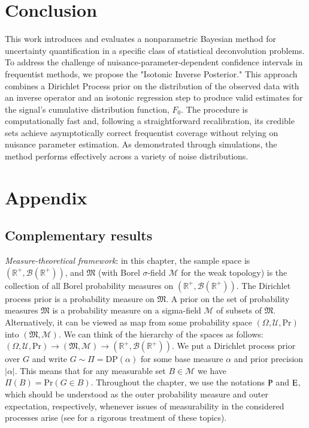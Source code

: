 \section{Conclusion}

This work introduces and evaluates a nonparametric Bayesian method for uncertainty quantification in a specific class of statistical deconvolution problems. To address the challenge of nuisance-parameter-dependent confidence intervals in frequentist methods, we propose the "Isotonic Inverse Posterior." This approach combines a Dirichlet Process prior on the distribution of the observed data with an inverse operator and an isotonic regression step to produce valid estimates for the signal's cumulative distribution function, \(F_0\). The procedure is computationally fast and, following a straightforward recalibration, its credible sets achieve asymptotically correct frequentist coverage without relying on nuisance parameter estimation. As demonstrated through simulations, the method performs effectively across a variety of noise distributions.


\newpage

\section{Appendix}\label{sec: appendix chapter4}

\subsection{Complementary results}
\textit{Measure-theoretical framework}: in this chapter, the sample space is $(\mathbb{R}^+, \mathscr{B}(\mathbb{R}^+))$, and $\mathfrak{M}$ (with Borel $\sigma$-field $\mathscr{M}$ for the weak topology) is the collection of all Borel probability measures on $(\mathbb{R}^+, \mathscr{B}(\mathbb{R}^+))$. The Dirichlet process prior is a probability measure on $\mathfrak{M}$. A prior on the set of probability measures $\mathfrak{M}$ is a probability measure on a sigma-field $\mathscr{M}$ of subsets of $\mathfrak{M}$. Alternatively, it can be viewed as map from some probability space $(\Omega, \mathscr{U}, \mathrm{Pr})$ into $(\mathfrak{M}, \mathscr{M})$. We can think of the hierarchy of the spaces as follows: $(\Omega, \mathscr{U}, \mathrm{Pr}) \rightarrow (\mathfrak{M}, \mathscr{M}) \rightarrow (\mathbb{R}^+, \mathscr{B}(\mathbb{R}^+))$. We put a Dirichlet process prior over $G$ and write $G \sim \Pi = \mathrm{DP}( \alpha)$ for some base measure $\alpha$ and prior precision $|\alpha|$. This means that for any measurable set $B \in \mathscr{M}$ we have $\Pi(B) = \mathrm{Pr} ( G \in B)$. Throughout the chapter, we use the notations $\mathrm{P}$ and $\mathrm{E}$, which should be understood as the outer probability measure and outer expectation, respectively, whenever issues of measurability in the considered processes arise (see \cite{5} for a rigorous treatment of these topics). 

